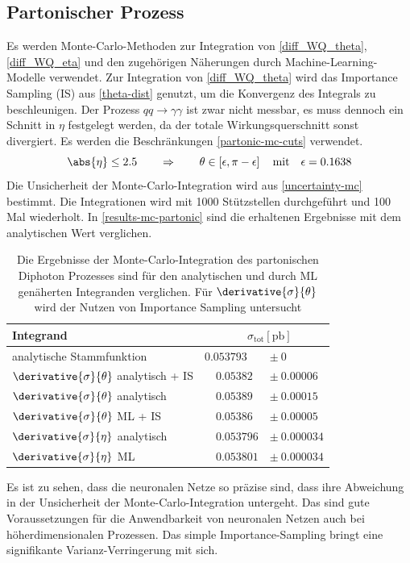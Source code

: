 \subsection{Partonischer Prozess}
Es werden Monte-Carlo-Methoden zur Integration von \textsf{\autoref{diff_WQ_theta}}, \textsf{\autoref{diff_WQ_eta}} und den zugehörigen Näherungen durch Machine-Learning-Modelle verwendet. Zur Integration von \textsf{\autoref{diff_WQ_theta}} wird das Importance Sampling (IS) aus \textsf{\autoref{theta-dist}} genutzt, um die Konvergenz des Integrals zu beschleunigen. Der Prozess $qq \rightarrow \gamma \gamma$ ist zwar nicht messbar, es muss dennoch ein Schnitt in $\eta$ festgelegt werden, da der totale Wirkungsquerschnitt sonst divergiert. Es werden die Beschränkungen \textsf{\autoref{partonic-mc-cuts}} verwendet.
\begin{equation}
\abs{\eta} \leq 2.5 \qquad \Rightarrow \qquad \theta \in \left[\epsilon, \pi - \epsilon \right] \quad \text{mit} \quad \epsilon = 0.1638
\label{partonic-mc-cuts}
\end{equation}
Die Unsicherheit der Monte-Carlo-Integration wird aus \textsf{\autoref{uncertainty-mc}} bestimmt. Die Integrationen wird mit 1000 Stützstellen durchgeführt und 100 Mal wiederholt. In \textsf{\autoref{results-mc-partonic}} sind die erhaltenen Ergebnisse mit dem analytischen Wert verglichen.
\begin{table}[bh]
	\centering
	\captionsetup{justification=justified}
	\caption{Die Ergebnisse der Monte-Carlo-Integration des partonischen Diphoton Prozesses sind für den analytischen und durch ML genäherten Integranden verglichen. Für $\derivative{\sigma}{\theta}$ wird der Nutzen von Importance Sampling untersucht}
	\begin{tabular}{lll}
		Integrand & \multicolumn{2}{c}{$\quad \sigma_{\text{tot}}[\text{pb}]$} \\
		\hline
		analytische Stammfunktion& \quad  $0.053793$ &$\pm~ 0$\\
		$\derivative{\sigma}{\theta}$ analytisch + IS & $\quad 0.05382 $&$\pm~ 0.00006 $ \\
		$\derivative{\sigma}{\theta}$ analytisch & $\quad 0.05389$ &$\pm~ 0.00015 $ \\
		$\derivative{\sigma}{\theta}$ ML + IS &$\quad 0.05386$ &$\pm~ 0.00005$ \\
		$\derivative{\sigma}{\eta}$ analytisch & $\quad 0.053796 $&$\pm~ 0.000034$ \\
		$\derivative{\sigma}{\eta}$ ML & $\quad 0.053801 $&$\pm~ 0.000034$ \\
		\hline
	\end{tabular}
	\label{results-mc-partonic}
\end{table}
Es ist zu sehen, dass die neuronalen Netze so präzise sind, dass ihre Abweichung in der Unsicherheit der Monte-Carlo-Integration untergeht. Das sind gute Voraussetzungen für die Anwendbarkeit von neuronalen Netzen auch bei höherdimensionalen Prozessen. Das simple Importance-Sampling bringt eine signifikante Varianz-Verringerung mit sich.
